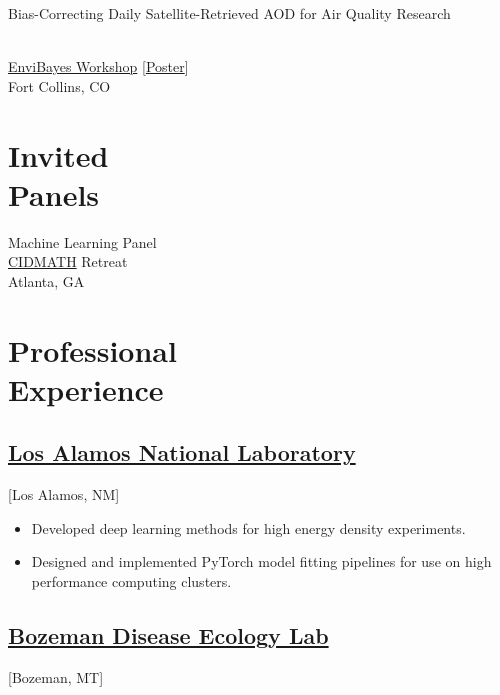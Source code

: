 \documentclass{wm_cv}
\begin{document}
\noindent\parbox[t]{0.75\textwidth}{\raggedright Bias-Correcting Daily Satellite-Retrieved AOD for Air Quality Research}\hfill {}\\
\indent \quad \href{https://statistics.colostate.edu/envibayes-workshop/}{EnviBayes Workshop} [\href{https://www.wyattgmadden.com/files/posters/20230918envibayes/envibayes2023.pdf}{Poster}] \\ 
   \indent \quad Fort Collins, CO \\

\section{Invited \\ Panels}

Machine Learning Panel \hfill {} \\
    \indent \quad \href{https://www.cidmath.org/}{CIDMATH} Retreat \\
   \indent \quad Atlanta, GA \\

\section{Professional \\ Experience}

\subsection{\href{https://cnls.lanl.gov}{Los Alamos National Laboratory}}[Los Alamos, NM]
\begin{positions}
\end{positions}
\begin{itemize}
  \item Developed deep learning methods for high energy density experiments.
  \item Designed and implemented PyTorch model fitting pipelines for use on high performance computing clusters.
\end{itemize}

\subsection{\href{http://bzndiseaselab.org/}{Bozeman Disease Ecology Lab}}[Bozeman, MT]
\begin{positions}
\end{positions}
\end{document}
